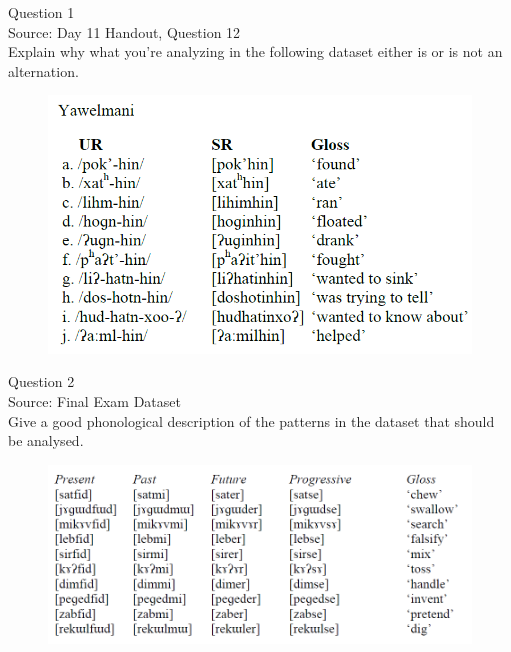 \documentclass[12pt]{article}
\begin{document}
{\large Question 1}\\

Source: Day 11 Handout, Question 12\\

Explain why what you’re analyzing in the following dataset either is or is not an alternation.\\

\begin{figure}[H]
\includegraphics{../images/yawelmani.png}
\end{figure}

\newpage

{\large Question 2}\\

Source: Final Exam Dataset\\

Give a good phonological description of the patterns in the dataset that should be analysed.\\

\begin{figure}[H]
\includegraphics{../images/final_dataset.png}
\end{figure}

\newpage
\end{document}
